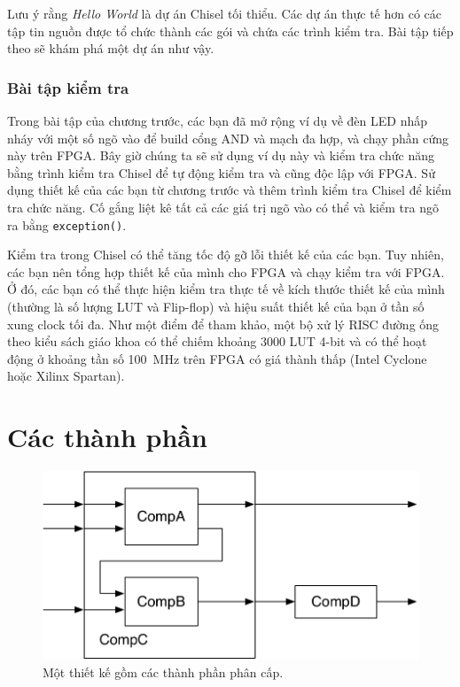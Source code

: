 \documentclass[%
    10pt,
    headinclude, footexclude,
    openright, %
    notitlepage,
    cleardoubleempty,
    headsepline,
    pointlessnumbers,
    bibtotoc, idxtotoc,
    ]{scrbook}
\newcommand{\code}[1]{{\small{\texttt{#1}}}}
\newcommand{\scale}{0.7}
\begin{document}
Lưu ý rằng \emph{Hello World} là dự án Chisel tối thiểu.
Các dự án thực tế hơn có các tập tin nguồn được tổ chức thành các gói và chứa các trình kiểm tra.
Bài tập tiếp theo sẽ khám phá một dự án như vậy.

\subsection{Bài tập kiểm tra}

Trong bài tập của chương trước, các bạn đã mở rộng ví dụ về đèn LED nhấp nháy với một số ngõ vào 
để build cổng AND và mạch đa hợp, và chạy phần cứng này trên FPGA. 
Bây giờ chúng ta sẽ sử dụng ví dụ này và kiểm tra chức năng bằng trình kiểm tra Chisel 
để tự động kiểm tra và cũng độc lập với FPGA. Sử dụng thiết kế của các bạn từ chương trước 
và thêm trình kiểm tra Chisel để kiểm tra chức năng. Cố gắng liệt kê tất cả các giá trị ngõ vào có thể 
và kiểm tra ngõ ra bằng \code{exception()}.

Kiểm tra trong Chisel có thể tăng tốc độ gỡ lỗi thiết kế của các bạn.
Tuy nhiên, các bạn nên tổng hợp thiết kế của mình cho FPGA và chạy kiểm tra với FPGA. 
Ở đó, các bạn có thể thực hiện kiểm tra thực tế về kích thước thiết kế của mình (thường là 
số lượng LUT và Flip-flop) và hiệu suất thiết kế của bạn ở tần số xung clock tối đa.
Như một điểm để tham khảo, một bộ xử lý RISC đường ống theo kiểu sách giáo khoa có thể chiếm 
khoảng 3000 LUT 4-bit và có thể hoạt động ở khoảng tần số 100~MHz trên FPGA có giá thành thấp 
(Intel Cyclone hoặc Xilinx Spartan).


\chapter{Các thành phần}


\begin{figure}
  \centering
  \includegraphics[scale=\scale]{figures/components}
  \caption{Một thiết kế gồm các thành phần phân cấp.}
  \label{fig:components}
\end{figure}
\end{document}
